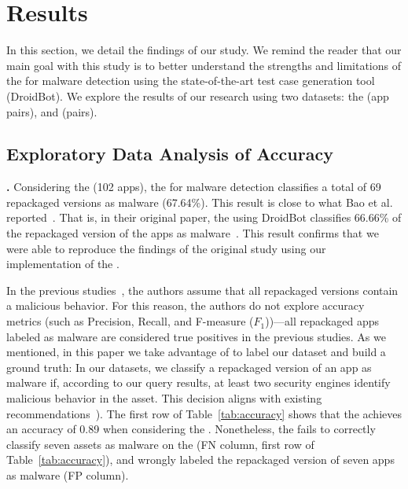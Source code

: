 \section{Results}\label{sec:results}


In this section, we detail the findings of our study.  We remind the reader that our main goal with this study is to
better understand the strengths and limitations of the \mas for malware detection using the state-of-the-art
test case generation tool (DroidBot). We explore
the results of our research using two datasets: the \sds (\appsSmall app pairs), and \cds (\apps pairs).


\subsection{Exploratory Data Analysis of Accuracy}\label{sec:accuracy}


{\bf \sds.} Considering the \sds (102 apps), the \mas for malware detection 
classifies a total of 69 repackaged versions as malware (67.64\%).
This result is close to what Bao et al. reported~\cite{DBLP:conf/wcre/BaoLL18}.
That is, in their original paper,  the \mas using DroidBot classifies 66.66\% of the
repackaged version of the apps as malware~\cite{DBLP:conf/wcre/BaoLL18}.
This result confirms that we were able to reproduce the findings of the original study using our
implementation of the \mas. 


In the previous studies~\cite{DBLP:conf/wcre/BaoLL18,DBLP:journals/jss/CostaMMSSBNR22},
the authors assume that all repackaged versions contain a
malicious behavior. For this reason, the authors do not
explore accuracy metrics (such as Precision, Recall, and
F-measure ($F_1$))---all repackaged apps labeled as
malware are considered true positives in the previous studies.
As we mentioned, in this paper we take advantage
of \vt to label our dataset and build a ground truth:
In our datasets, we classify a repackaged version of an app as malware if, according to our \vt
query results, at least two security engines identify malicious behavior in the asset.
This decision aligns with existing recommendations~\cite{DBLP:conf/uss/ZhuSYQZS020,DBLP:journals/ese/KhanmohammadiEH19}).
The first row of Table~\ref{tab:accuracy} shows that the \mas achieves an accuracy of 0.89 when
considering the \sds. Nonetheless, the \mas fails
to correctly classify seven assets as malware on the \sds (FN column, first row of Table~\ref{tab:accuracy}),
and wrongly labeled the repackaged version of seven apps as malware (FP column).


